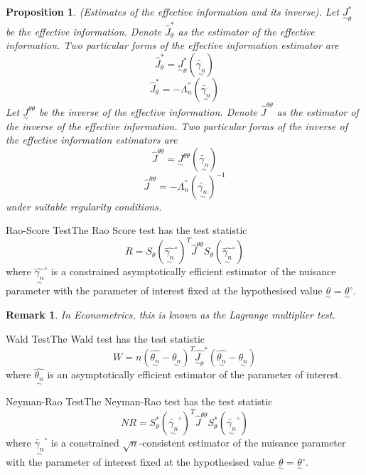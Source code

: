 \documentclass[twoside]{article}
\newtheorem{proposition}[theorem]{Proposition}
\newtheorem{remark}[theorem]{Remark}
\newcommand{\utilde}{\underset{\sim}}
\begin{document}
\begin{proposition}(Estimates of the effective information and its inverse). Let $\utilde{J}_{\theta}^{*}$ be the effective information. Denote $\hat{J}_{\theta}^{*}$ as the estimator of the effective information. Two particular forms of the effective information estimator are 
$$
\hat{J}_{\theta}^{*} = \utilde{J}_{\theta}^{*}(\tilde{\utilde{\gamma_n}})
$$
$$
\hat{J}_{\theta}^{*} = -\Lambda_n^{''}(\tilde{\utilde{\gamma_n}})
$$
Let $\utilde{J}^{\theta \theta}$ be the inverse of the effective information. Denote $\hat{J}^{\theta \theta}$ as the estimator of the inverse of the effective information. Two particular forms of the inverse of the effective information estimators are 
$$
\hat{J}^{\theta \theta} = \utilde{J}^{\theta \theta}(\tilde{\utilde{\gamma_n}})
$$
$$
\hat{J}^{\theta \theta} = -\Lambda_n^{''}(\tilde{\utilde{\gamma_n}})^{-1}
$$
under suitable regularity conditions.
\end{proposition}

\begin{definition_exam}{Rao-Score Test}{}The Rao Score test has the test statistic 
$$
R = S_{\theta}(\hat{\utilde{\gamma_n}}^{\circ})^T\hat{J}^{\theta \theta}S_{\theta}(\hat{\utilde{\gamma_n}}^{\circ})
$$
where $\hat{\utilde{\gamma_n}}^{\circ}$ is a constrained asymptotically efficient estimator of the nuisance parameter with the parameter of interest fixed at the hypothesised value $\utilde{\theta} = \utilde{\theta}^{\circ}.$
\end{definition_exam}
\begin{remark}In Econometrics, this is known as the Lagrange multiplier test.
\end{remark}

\begin{definition_exam}{Wald Test}{}The Wald test has the test statistic 
$$
W = n(\hat{\utilde{\theta_n}} - \utilde{\theta_n})^T\hat{\utilde{J}_{\theta}}^{*}(\hat{\utilde{\theta_n}} - \utilde{\theta_n})
$$
where $\hat{\utilde{\theta_n}}$ is an asymptotically efficient estimator of the parameter of interest.
\end{definition_exam}

\begin{definition_exam}{Neyman-Rao Test}{}The Neyman-Rao test has the test statistic 
$$
NR = S_{\theta}^{*}(\tilde{\utilde{\gamma_n}}^{\circ})^T\hat{J}^{\theta \theta}S_{\theta}^{*}(\tilde{\utilde{\gamma_n}}^{\circ})
$$
where $\tilde{\utilde{\gamma_n}}^{\circ}$ is a constrained $\sqrt{n}$-consistent estimator of the nuisance parameter with the parameter of interest fixed at the hypothesised value $\utilde{\theta} = \utilde{\theta}^{\circ}.$
\end{definition_exam}
\end{document}
